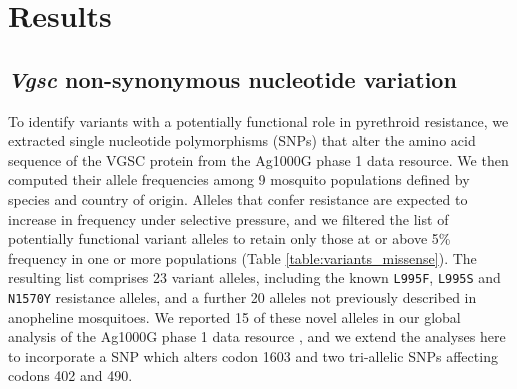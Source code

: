\documentclass[a4paper,11pt,abstracton,hidelinks]{scrartcl}
\begin{document}
\section*{Results}


\subsection*{\textit{Vgsc} non-synonymous nucleotide variation}


%
To identify variants with a potentially functional role in pyrethroid resistance, we extracted single nucleotide polymorphisms (SNPs) that alter the amino acid sequence of the VGSC protein from the Ag1000G phase 1 data resource.
%
We then computed their allele frequencies among 9 mosquito populations defined by species and country of origin.
%
Alleles that confer resistance are expected to increase in frequency under selective pressure, and we filtered the list of potentially functional variant alleles to retain only those at or above 5\% frequency in one or more populations (Table \ref{table:variants_missense}).
%
The resulting list comprises 23 variant alleles, including the known \texttt{L995F}, \texttt{L995S} and \texttt{N1570Y} resistance alleles, and a further 20 alleles not previously described in anopheline mosquitoes.
%
We reported 15 of these novel alleles in our global analysis of the Ag1000G phase 1 data resource \cite{Ag1000gConsortium2017}, and we extend the analyses here to incorporate a SNP which alters codon 1603 and two tri-allelic SNPs affecting codons 402 and 490.
\end{document}

